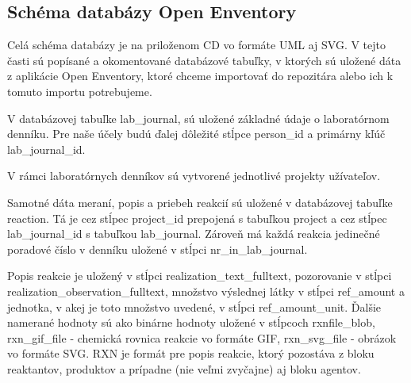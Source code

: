 \documentclass[thesis=M,slovak]{FITthesis}[2013/05/06]
\begin{document}
\subsection{Schéma databázy Open Enventory}
Celá schéma databázy je na priloženom CD vo formáte UML aj SVG. V tejto časti sú popísané a okomentované databázové tabuľky, v ktorých sú uložené dáta z aplikácie Open Enventory, ktoré chceme importovať do repozitára alebo ich k tomuto importu potrebujeme.


V databázovej tabuľke lab\_journal, sú uložené základné údaje o laboratórnom denníku. Pre naše účely budú ďalej dôležité stĺpce person\_id a primárny kľúč lab\_journal\_id.


V rámci laboratórnych denníkov sú vytvorené jednotlivé projekty užívateľov.


Samotné dáta meraní, popis a priebeh reakcií sú uložené v databázovej tabuľke reaction. Tá je cez stĺpec project\_id prepojená s tabuľkou project a cez stĺpec lab\_journal\_id s tabuľkou lab\_journal. Zároveň má každá reakcia jedinečné poradové číslo v denníku uložené v stĺpci nr\_in\_lab\_journal.

Popis reakcie je uložený v stĺpci realization\_text\_fulltext, pozorovanie v stĺpci realization\_observation\_fulltext, množstvo výslednej látky v stĺpci ref\_amount a jednotka, v akej je toto množstvo uvedené, v stĺpci ref\_amount\_unit. Ďalšie namerané hodnoty sú ako binárne hodnoty uložené v stĺpcoch rxnfile\_blob, rxn\_gif\_file - chemická rovnica reakcie vo formáte GIF, rxn\_svg\_file - obrázok vo formáte SVG. RXN je formát pre popis reakcie, ktorý pozostáva z bloku reaktantov, produktov a prípadne (nie veľmi zvyčajne) aj bloku agentov.
\end{document}
